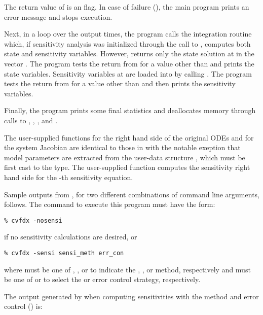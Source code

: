 The return value of  is an  flag. In case of failure
(), the main program prints an error message and stops execution.

Next, in a loop over the  output times, the program calls the integration
routine  which, if sensitivity analysis was initialized through the call
to , computes both state and sensitivity variables. However,
 returns only the state solution at  in the vector .
The program tests the return from  for a value other than  and
prints the state variables.
Sensitivity variables at  are loaded into  by calling .
The program tests the return from  for a value other than  
and then prints the sensitivity variables.

Finally, the program prints some final statistics and deallocates memory through calls
to , , , and .

The user-supplied functions  for the right hand side of the original ODEs and
 for the system Jacobian are identical to those in  with the 
notable exeption that model parameters are extracted from the user-data structure
, which must be first cast to the  type. The user-supplied
function  computes the sensitivity right hand side for the -th 
sensitivity equation.

Sample outputs from , for two different combinations of command line arguments, 
follows. The command to execute this program must have the form:
\begin{verbatim}
% cvfdx -nosensi
\end{verbatim} 
if no sensitivity calculations are desired, or
\begin{verbatim}
% cvfdx -sensi sensi_meth err_con
\end{verbatim}
where  must be one of , , or  to
indicate the , , or  method,
respectively and  must be one of  or  to
select the  or  error control strategy, respectively.

The output generated by  when computing sensitivities with the 
method and  error control () is:

